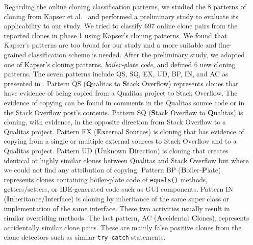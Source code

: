 \documentclass[sigconf,review, anonymous]{acmart}
\begin{document}
Regarding the online cloning classification patterns, 
we studied the 8 patterns of cloning from Kapser et
al.~\cite{Kapser2006,Kapser2008} and performed a preliminary study to
evaluate its applicability to our study. 
We tried to classify 697 online clone pairs from
the reported clones in phase 1 
using Kapser's cloning patterns. We found that 
Kapser's patterns are too broad for our study and a
more suitable and fine-grained classification scheme is needed. After
the preliminary study, we adopted one of Kapser's cloning patterns,
\emph{boiler-plate code}, and defined
6 new cloning patterns. The seven patterns include QS, SQ, EX, UD, BP,
IN, and AC as presented in . Pattern
QS (\textbf{Q}ualitas to \textbf{S}tack Overflow) represents clones
that have evidence of being copied from a Qualitas project to Stack
Overflow. The evidence of copying can be found in comments in the
Qualitas source code or in the Stack Overflow post's contents. Pattern
SQ (\textbf{S}tack Overflow to \textbf{Q}ualitas) is cloning, with
evidence, in the opposite direction from Stack Overflow to a Qualitas
project. Pattern EX (\textbf{Ex}ternal Sources) is cloning that has
evidence of copying from a single or multiple external sources to
Stack Overflow and to a Qualitas project.  Pattern UD
(\textbf{U}nknown \textbf{D}irection) is cloning that creates
identical or highly similar clones between Qualitas and Stack Overflow
but where we could not find any attribution of copying.
Pattern BP (\textbf{B}oiler-\textbf{P}late) represents clones
containing boiler-plate code of {\small\verb|equals()|} methods,
getters/setters, or IDE-generated code such as GUI components. Pattern
IN (\textbf{In}heritance/Interface) is cloning by inheritance of the
same super class or implementation of the same interface. These two
activities usually result in similar overriding methods. The last
pattern, AC (\textbf{A}ccidental \textbf{C}lones), represents
accidentally similar clone pairs. These are mainly false positive
clones from the clone detectors such as similar
{\small\texttt{try-catch}} statements.
\end{document}
